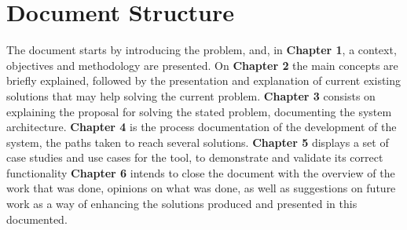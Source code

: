 \section{Document Structure}
The document starts by introducing the problem, and, in \textbf{Chapter 1}, a context, objectives and methodology are presented.
On \textbf{Chapter 2} the main concepts are briefly explained, followed by the presentation and explanation of current existing solutions that may help solving the current problem.
\textbf{Chapter 3} consists on explaining the proposal for solving the stated problem, documenting the system architecture.
\textbf{Chapter 4} is the process documentation of the development of the system, the paths taken to reach several solutions.
\textbf{Chapter 5} displays a set of case studies and use cases for the tool, to demonstrate and validate its correct functionality
\textbf{Chapter 6} intends to close the document with the overview of the work that was done, opinions on what was done, as well as suggestions on future work as a way of enhancing the solutions
produced and presented in this documented.
